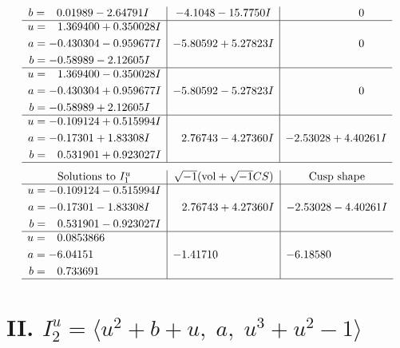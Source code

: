 \documentclass[1p]{elsarticle_modified}
\theoremstyle{definition}
\newcommand{\I}{\sqrt{-1}}
\begin{document}
$$\begin{array}{c|c|c}
\begin{aligned}
b &= \phantom{-}0.01989 - 2.64791 I\end{aligned}
 & -4.1048 - 15.7750 I & \phantom{-0.000000 } 0 \\ \hline\begin{aligned}
u &= \phantom{-}1.369400 + 0.350028 I \\
a &= -0.430304 - 0.959677 I \\
b &= -0.58989 - 2.12605 I\end{aligned}
 & -5.80592 + 5.27823 I & \phantom{-0.000000 } 0 \\ \hline\begin{aligned}
u &= \phantom{-}1.369400 - 0.350028 I \\
a &= -0.430304 + 0.959677 I \\
b &= -0.58989 + 2.12605 I\end{aligned}
 & -5.80592 - 5.27823 I & \phantom{-0.000000 } 0 \\ \hline\begin{aligned}
u &= -0.109124 + 0.515994 I \\
a &= -0.17301 + 1.83308 I \\
b &= \phantom{-}0.531901 + 0.923027 I\end{aligned}
 & \phantom{-}2.76743 - 4.27360 I & -2.53028 + 4.40261 I\\
 \hline 
 \end{array}$$\newpage$$\begin{array}{c|c|c}  
\text{Solutions to }I^u_{1}& \I (\text{vol} + \sqrt{-1}CS) & \text{Cusp shape}\\
 \hline 
\begin{aligned}
u &= -0.109124 - 0.515994 I \\
a &= -0.17301 - 1.83308 I \\
b &= \phantom{-}0.531901 - 0.923027 I\end{aligned}
 & \phantom{-}2.76743 + 4.27360 I & -2.53028 - 4.40261 I \\ \hline\begin{aligned}
u &= \phantom{-}0.0853866\phantom{ +0.000000I} \\
a &= -6.04151\phantom{ +0.000000I} \\
b &= \phantom{-}0.733691\phantom{ +0.000000I}\end{aligned}
 & -1.41710\phantom{ +0.000000I} & -6.18580\phantom{ +0.000000I}\\
 \hline 
 \end{array}$$\newpage\newpage\renewcommand{\arraystretch}{1}
\centering \section*{II. $I^u_{2}= \langle u^2+b+u,\;a,\;u^3+u^2-1 \rangle$}
\end{document}
